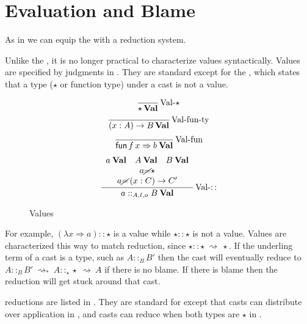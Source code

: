 \section{\CLang{} Evaluation and Blame}

As in  we can equip the \slang{} with a \cbv{} reduction system.

Unlike the \slang{}, it is no longer practical to characterize values syntactically.
Values are specified by judgments in .
They are standard except for the , which states that a type ($\star$ or function type) under a cast is not a value.
 
\begin{figure}
\[
\frac{\,}{\star\,\textbf{Val}}
\operatorname{Val-\star}
\]
\[
\frac{\,}{\left(x:A\right)\rightarrow B\,\textbf{Val}}
\operatorname{Val-fun-ty}
\]
\[
\frac{\,}{\mathsf{fun}\,f\,x\Rightarrow b\:\textbf{Val}}
\operatorname{Val-fun}
\]
\[
\frac{\begin{array}{c}
a\:\textbf{Val}\quad A\:\textbf{Val}\quad B\:\textbf{Val}\\
a\cancel{=}\star\\
a\cancel{=}\left(x:C\right)\rightarrow C'
\end{array}}{a::_{A,\ell, o}B\:\textbf{Val}}
\operatorname{Val-::}
\]
\caption{\CLang{} Values}
\label{fig:cast-val}
\end{figure}

For example, $(\lambda x\Rightarrow a) ::\star$ is a value while $\star ::\star$ is not a value.
Values are characterized this way to match reduction, since  $\star ::\star\ \rightsquigarrow\ \star$.
If the underling term of a cast is a type, such as $A ::_{B}B'$ then the cast will eventually reduce to $A ::_{B}B'\ \rightsquigarrow_{\ast}\ A ::_{\star}\star\ \rightsquigarrow\ A$ if there is no blame.
If there is blame then the reduction will get stuck around that cast.

\Cbv{} reductions are listed in .
They are standard for \cbv{} except that casts can distribute over application in , and casts can reduce when both types are $\star$ in .
 
